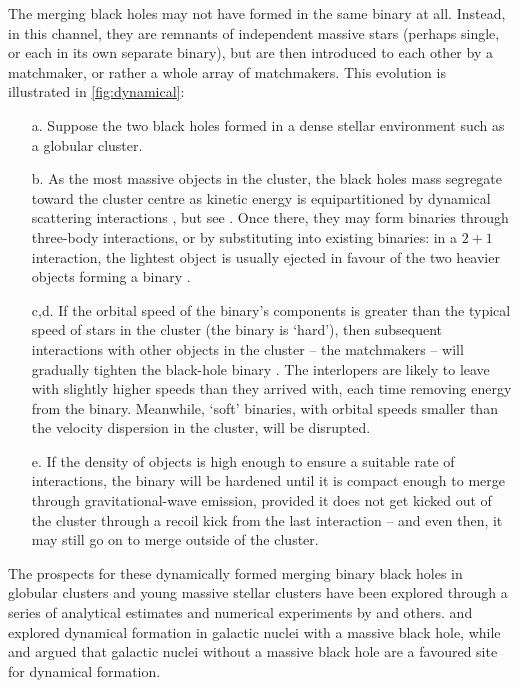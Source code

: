 \documentclass[review]{elsarticle}
\begin{document}
The merging black holes may not have formed in the same binary at all.  Instead, in this channel, they are remnants of independent massive stars (perhaps single, or each in its own separate binary), but are then introduced to each other by a matchmaker, or rather a whole array of matchmakers.   This evolution is illustrated in \autoref{fig:dynamical}: 
\begin{enumerate}
\item[a.] Suppose the two black holes formed in a dense stellar environment such as a globular cluster.  
\item[b.] As the most massive objects in the cluster, the black holes mass segregate toward the cluster centre as kinetic energy is equipartitioned by dynamical scattering interactions \citep{Spitzer:1969,BinneyTremaine}, but see \citep{Trenti:2013}.  Once there, they may form binaries through three-body interactions, or by substituting into existing binaries: in a $2+1$ interaction, the lightest object is usually ejected in favour of the two heavier objects forming a binary \citep{HillsFullerton:1980}.  
\item[c,d.] If the orbital speed of the binary's components is greater than the typical speed of stars in the cluster (the binary is `hard'), then subsequent interactions with other objects in the cluster -- the matchmakers -- will gradually tighten the black-hole binary \citep{Heggie:1975}. The interlopers are likely to leave with slightly higher speeds than they arrived with, each time removing energy from the binary.   Meanwhile, `soft' binaries, with orbital speeds smaller than the velocity dispersion in the cluster, will be disrupted. 
\item[e.] If the density of objects is high enough to ensure a suitable rate of interactions, the binary will be hardened until it is compact enough to merge through gravitational-wave emission, provided it does not get kicked out of the cluster through a recoil kick from the last interaction -- and even then, it may still go on to merge outside of the cluster.  
\end{enumerate}

The prospects for these dynamically formed merging binary black holes in globular clusters and young massive stellar clusters have been explored through a series of analytical estimates and numerical experiments by \cite{Sigurdsson:1993,Kulkarni:1993,PZwart:2000,OLeary:2006,Banerjee:2010,Downing:2011,Morscher:2015,Rodriguez:2016,Askar:2016,Park:2017,FragioneKocsis:2018,Mapelli:2020} and others.  \citet{OLeary:2008} \citep[but see][]{Tsang:2013} and \citet{AntoniniPerets:2012} explored dynamical formation in galactic nuclei with a massive black hole, while \citet{MillerLauburg:2008} and \citet{AntoniniRasio:2016} argued that galactic nuclei without a massive black hole are a favoured site for dynamical formation.  
\end{document}
